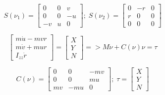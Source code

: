 \begin{equation*}
S(\nu_1) = \begin{bmatrix}
0 & 0 & v \\
0 & 0 & -u \\
-v & u & 0
\end{bmatrix};\; S(\nu_2) = \begin{bmatrix}
0 & -r & 0 \\
r & 0 & 0 \\
0 & 0 & 0
\end{bmatrix}
\end{equation*}

\noindent{\rule{4cm}{0.4pt}}

\begin{equation*}
\begin{bmatrix}
m\Dot{u} - mvr \\
m\Dot{v} + mur \\
I_{zz}\Dot{r}
\end{bmatrix} = \begin{bmatrix}
X \\
Y \\
N
\end{bmatrix} => M\Dot{\nu} + C(\nu)\nu = \tau
\end{equation*}

\begin{equation*}
C(\nu) = \begin{bmatrix}
0 & 0 & -mv \\
0 & 0 & mu \\
mv & -mu & 0 
\end{bmatrix};\; \tau = \begin{bmatrix}
X \\
Y \\
N
\end{bmatrix}
\end{equation*}

